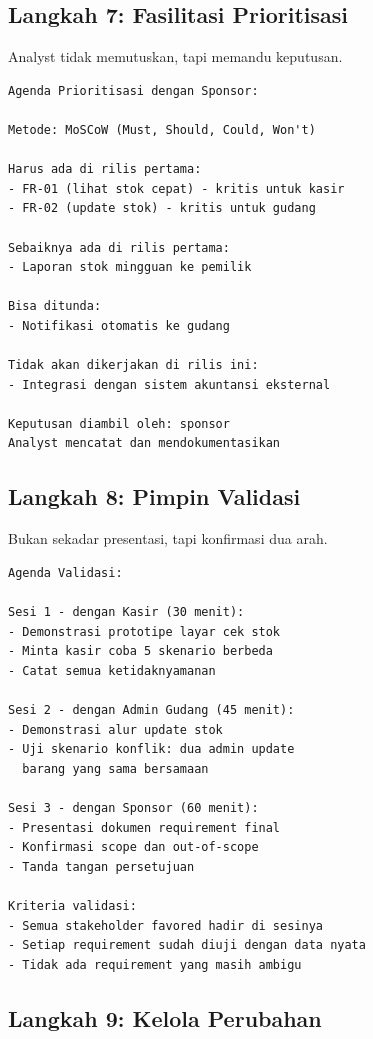 \documentclass[11pt,a4paper]{article}
\begin{document}
\subsection{Langkah 7: Fasilitasi Prioritisasi}

Analyst tidak memutuskan, tapi memandu keputusan.

\begin{lstlisting}[style=out]
Agenda Prioritisasi dengan Sponsor:

Metode: MoSCoW (Must, Should, Could, Won't)

Harus ada di rilis pertama:
- FR-01 (lihat stok cepat) - kritis untuk kasir
- FR-02 (update stok) - kritis untuk gudang

Sebaiknya ada di rilis pertama:
- Laporan stok mingguan ke pemilik

Bisa ditunda:
- Notifikasi otomatis ke gudang

Tidak akan dikerjakan di rilis ini:
- Integrasi dengan sistem akuntansi eksternal

Keputusan diambil oleh: sponsor
Analyst mencatat dan mendokumentasikan
\end{lstlisting}

\subsection{Langkah 8: Pimpin Validasi}

Bukan sekadar presentasi, tapi konfirmasi dua arah.

\begin{lstlisting}[style=out]
Agenda Validasi:

Sesi 1 - dengan Kasir (30 menit):
- Demonstrasi prototipe layar cek stok
- Minta kasir coba 5 skenario berbeda
- Catat semua ketidaknyamanan

Sesi 2 - dengan Admin Gudang (45 menit):
- Demonstrasi alur update stok
- Uji skenario konflik: dua admin update
  barang yang sama bersamaan

Sesi 3 - dengan Sponsor (60 menit):
- Presentasi dokumen requirement final
- Konfirmasi scope dan out-of-scope
- Tanda tangan persetujuan

Kriteria validasi:
- Semua stakeholder favored hadir di sesinya
- Setiap requirement sudah diuji dengan data nyata
- Tidak ada requirement yang masih ambigu
\end{lstlisting}

\subsection{Langkah 9: Kelola Perubahan}
\end{document}
